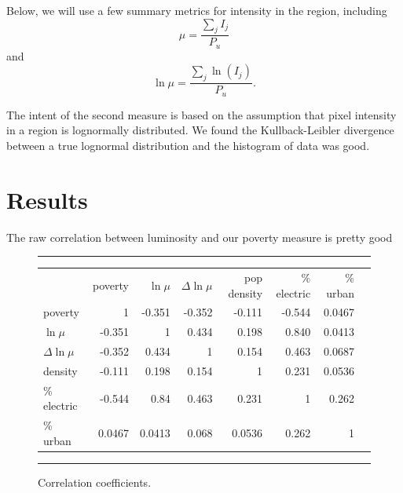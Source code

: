 \documentclass{article}
\begin{document}
Below, we will use a few summary metrics for intensity in the region, including $$\mu = \frac{\sum_j I_j}{P_u}$$
and 
$$\ln\mu = \frac{\sum_j \ln(I_j)}{P_u}.$$

The intent of the second measure is based on the assumption that pixel intensity in a
region is lognormally distributed. We found the Kullback-Leibler divergence between a true
lognormal distribution and the histogram of data was good.

\section{Results}
The raw correlation between luminosity and our poverty measure is pretty good


\begin{figure}
\begin{center}
\hrule
\begin{tabular}{lrrrrrrr}
& poverty        &   $\ln\mu$  &    $\Delta\ln\mu$ &  pop density &   \% electric & \% urban \\
poverty        &   1 & -0.351&  -0.352&        -0.111&    -0.544& 0.0467\\
$\ln\mu$       & -0.351&     1  &   0.434&       0.198&    0.840& 0.0413\\
$\Delta\ln\mu$ & -0.352&  0.434&    1 &         0.154&    0.463&0.0687\\
density    & -0.111&  0.198&   0.154&           1 &    0.231& 0.0536\\
\% electric     & -0.544&   0.84&  0.463 &        0.231&      1    &  0.262\\
\% urban       & 0.0467& 0.0413&  0.068&       0.0536&     0.262&     1
\end{tabular}
\hrule
\end{center}
\caption{Correlation coefficients.}
\end{figure}
\end{document}
